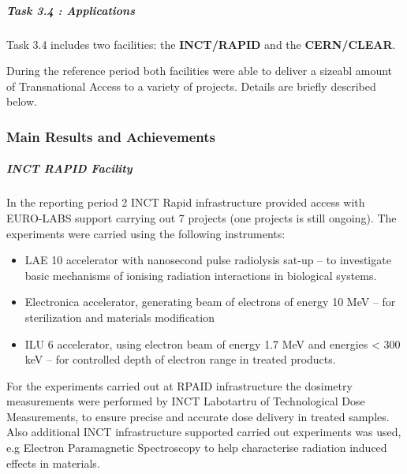 {\subparagraph{Task 3.4 : Applications} \mbox{}



Task 3.4 includes two facilities: the {\bf INCT/RAPID} and the {\bf CERN/CLEAR}.

During the reference period both facilities were able to deliver a sizeabl amount of Transnational Access to a variety of projects. Details are briefly described below. 

\subsubsection*{Main Results and Achievements}


\subparagraph*{INCT RAPID Facility} In the reporting period 2 INCT Rapid infrastructure provided access with EURO-LABS support carrying out 7 projects (one projects is still ongoing). The experiments were carried using the following instruments: 
\begin{itemize}
\item LAE 10 accelerator with nanosecond pulse radiolysis sat-up – to investigate basic mechanisms of ionising radiation interactions in biological systems.
\item Electronica accelerator, generating beam of electrons of energy 10 MeV – for sterilization and materials modification
\item ILU 6 accelerator, using electron beam of energy 1.7 MeV and energies < 300 keV – for controlled depth of electron range in treated products.
\end{itemize}
For the experiments carried out at RPAID infrastructure the dosimetry measurements were performed by INCT Labotartru of Technological Dose Measurements, to ensure precise and accurate dose delivery in treated samples. Also additional INCT infrastructure supported carried out experiments was used, e.g Electron Paramagnetic Spectroscopy to help characterise radiation induced effects in materials.

}
